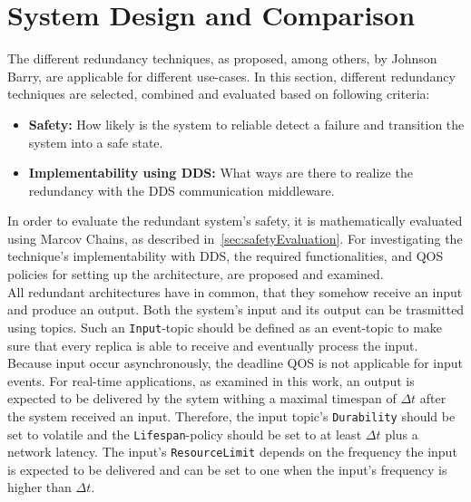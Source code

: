 
\section{System Design and Comparison}
The different redundancy techniques, as proposed, among others, by Johnson Barry, are applicable for different use-cases.
In this section, different redundancy techniques are selected, combined and evaluated based on following criteria:

\begin{itemize}
\item \textbf{Safety:} How likely is the system to reliable detect a failure and transition the system into a safe state.
\item \textbf{Implementability using \gls*{DDS}:} What ways are there to realize the redundancy with the \gls*{DDS} communication middleware.
\end{itemize}

In order to evaluate the redundant system's safety, it is mathematically evaluated using Marcov Chains, as described in~\autoref{sec:safetyEvaluation}.
For investigating the technique's implementability with \gls*{DDS}, the required functionalities, and \gls*{QOS} policies for setting up the architecture, are proposed and examined.
\\

All redundant architectures have in common, that they somehow receive an input and produce an output.
Both the system's input and its output can be trasmitted using  topics.
Such an \texttt{Input}-topic should be defined as an event-topic to make sure that every replica is able to receive and eventually process the input.
Because input occur asynchronously, the deadline \gls*{QOS} is not applicable for input events.
For real-time applications, as examined in this work, an output is expected to be delivered by the sytem withing a maximal timespan of $\Delta t$ after the system received an input.
Therefore, the input topic's \texttt{Durability} should be set to volatile and the \texttt{Lifespan}-policy should be set to at least $\Delta t$ plus a network latency.
The input's \texttt{ResourceLimit} depends on the frequency the input is expected to be delivered and can be set to one when the input's frequency is higher than $\Delta t$.
\\

